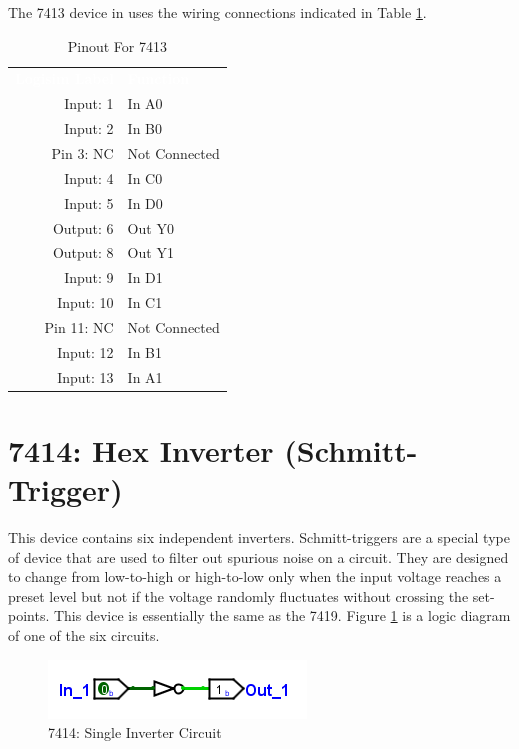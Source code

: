 The 7413 device in \LE uses the wiring connections indicated in Table \ref{tab:50-7413}.

\begin{table}[H]
	\sffamily
	\newcommand{\head}[1]{\textcolor{white}{\textbf{#1}}}		
	\begin{center}
		\begin{tabular}{rl} 
			\rowcolor{black!75}
			\head{Logisim Label} & \head{Function} \\
			Input: 1    & In A0  \\
			Input: 2    & In B0  \\
			Pin 3: NC   & Not Connected \\
			Input: 4    & In C0  \\
			Input: 5    & In D0  \\
			Output: 6   & Out Y0 \\
			Output: 8   & Out Y1 \\
			Input: 9    & In D1  \\
			Input: 10   & In C1  \\
			Pin 11: NC  & Not Connected \\
			Input: 12   & In B1  \\
			Input: 13    & In A1  \\
		\end{tabular}
	\end{center}
	\caption{Pinout For 7413}
	\label{tab:50-7413}
\end{table}

\section{7414: Hex Inverter (Schmitt-Trigger)}

This device contains six independent inverters. Schmitt-triggers are a special type of device that are used to filter out spurious noise on a circuit. They are designed to change from low-to-high or high-to-low only when the input voltage reaches a preset level but not if the voltage randomly fluctuates without crossing the set-points. This device is essentially the same as the 7419. Figure \ref{fig:50-7414} is a logic diagram of one of the six circuits.

\begin{figure}[H]
	\centering
	\includegraphics{gfx/50-7404}
	\caption{7414: Single Inverter Circuit}
	\label{fig:50-7414}
\end{figure}

